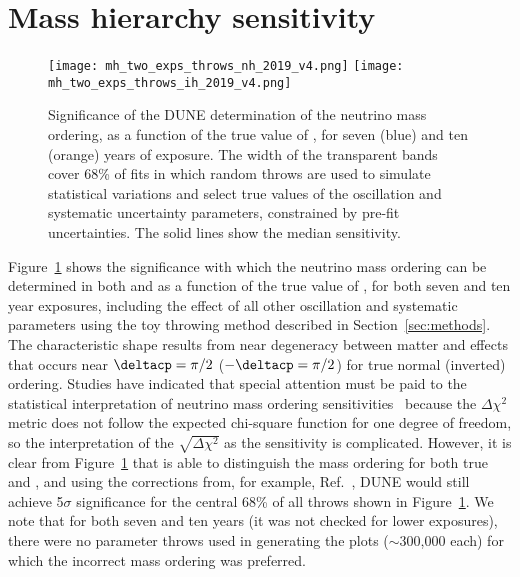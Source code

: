 \section{Mass hierarchy sensitivity}
\label{sec:mh_sens}

\begin{figure}[htbp]
  \centering
  \texttt{[image: mh\_two\_exps\_throws\_nh\_2019\_v4.png]}
  \texttt{[image: mh\_two\_exps\_throws\_ih\_2019\_v4.png]}
  \caption[Significance of the DUNE neutrino mass ordering determination, as a function of \deltacp]{Significance of the DUNE determination of the neutrino mass ordering, as a function of the true value of \deltacp, for seven (blue) and ten (orange) years of exposure. The width of the transparent bands cover 68\% of fits in which random throws are used to simulate statistical variations and select true values of the oscillation and systematic uncertainty parameters, constrained by pre-fit uncertainties. The solid lines show the median sensitivity.}
  \label{fig:mh_nominal}
\end{figure}
Figure~\ref{fig:mh_nominal} shows the significance with which the neutrino mass ordering can be determined in both  and  as a function of the true value of \deltacp, for both seven and ten year exposures, including the effect of all other oscillation and systematic parameters using the toy throwing method described in Section~\ref{sec:methods}. The characteristic shape results from near degeneracy between matter and  effects that occurs near $\deltacp=\pi/2$ ($-\deltacp=\pi/2$) for true normal (inverted) ordering. Studies have indicated that special attention must be paid to the statistical interpretation of neutrino mass ordering sensitivities~\cite{Ciuffoli:2013rza,Qian:2012zn,Blennow:2013oma} because the $\Delta\chi^2$ metric does not follow the expected chi-square function for one degree of freedom, so the interpretation of the $\sqrt{\Delta \chi^{2}}$ as the sensitivity is complicated. However, it is clear from Figure~\ref{fig:mh_nominal} that  is able to distinguish the mass ordering for both true  and , and using the corrections from, for example, Ref.~\cite{Ciuffoli:2013rza}, DUNE would still achieve 5$\sigma$ significance for the central 68\% of all throws shown in Figure~\ref{fig:mh_nominal}. We note that for both seven and ten years (it was not checked for lower exposures), there were no parameter throws used in generating the plots ($\sim$300,000 each) for which the incorrect mass ordering was preferred.
